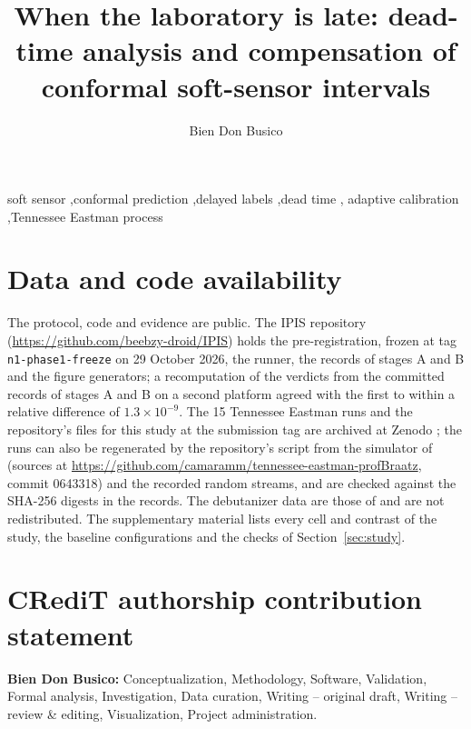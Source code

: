 \documentclass[final,5p,times,twocolumn]{elsarticle}
\begin{document}
\begin{frontmatter}

\title{When the laboratory is late: dead-time analysis and compensation of conformal
soft-sensor intervals}

\author{Bien Don Busico}
\address{University of the Philippines Diliman, Quezon City, Philippines}

\begin{abstract}

\end{abstract}

\begin{keyword}
soft sensor \sep conformal prediction \sep delayed labels \sep dead time \sep
adaptive calibration \sep Tennessee Eastman process
\end{keyword}

\end{frontmatter}









\section*{Data and code availability}
The protocol, code and evidence are public. The IPIS repository
(\url{https://github.com/beebzy-droid/IPIS}) holds the pre-registration, frozen at tag
\texttt{n1-phase1-freeze} on 29 October 2026, the runner, the records of stages A and B and the
figure generators; a recomputation of the verdicts from the committed records of stages A and B
on a second platform agreed with the first to within a relative difference of
$1.3 \times 10^{-9}$. The 15 Tennessee Eastman runs and the repository's files for this
study at the submission tag are archived at Zenodo \citep{busico2026data}; the runs can also be
regenerated by the repository's script from the simulator of \citet{russell2000} (sources at
\url{https://github.com/camaramm/tennessee-eastman-profBraatz}, commit 0643318) and the recorded
random streams, and are checked against the SHA-256 digests in the records. The debutanizer data
are those of \citet{fortuna2007} and are not redistributed. The supplementary material
lists every cell and contrast of the study, the baseline configurations and the checks of
Section~\ref{sec:study}.

\section*{CRediT authorship contribution statement}
\textbf{Bien Don Busico:} Conceptualization, Methodology, Software, Validation, Formal analysis,
Investigation, Data curation, Writing -- original draft, Writing -- review \& editing,
Visualization, Project administration.
\end{document}
